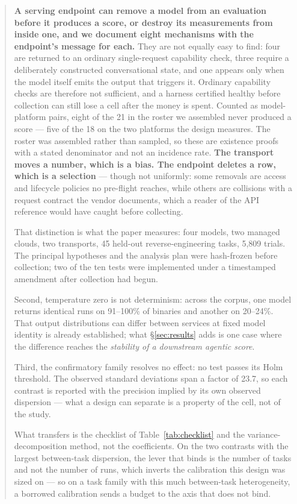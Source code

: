 \begin{abstract}
\textbf{A serving endpoint can remove a model from an evaluation before it produces a score, or destroy
its measurements from inside one, and we document eight mechanisms with the endpoint's message for each.}
They are not equally easy to find: four are returned to an ordinary single-request capability check, three
require a deliberately constructed conversational state, and one appears only when the model itself emits
the output that triggers it. Ordinary capability checks are therefore not sufficient, and a harness
certified healthy before collection can still lose a cell after the money is spent. Counted as
model-platform pairs, eight of the 21 in the roster we assembled never produced a score --- five of the 18
on the two platforms the design measures. The roster was assembled rather than sampled, so these are
existence proofs with a stated denominator and not an incidence rate. \textbf{The transport moves a number,
which is a bias. The endpoint deletes a row, which is a selection} --- though not uniformly: some removals
are access and lifecycle policies no pre-flight reaches, while others are collisions with a request
contract the vendor documents, which a reader of the API reference would have caught before collecting.

That distinction is what the paper measures: four models, two managed clouds, two transports, 45 held-out
reverse-engineering tasks, 5{,}809 trials. The principal hypotheses and the analysis plan were hash-frozen
before collection; two of the ten tests were implemented under a timestamped amendment after collection had
begun.

Second, temperature zero is not determinism: across the corpus, one model returns identical runs on
91--100\% of binaries and another on 20--24\%. That output distributions can differ between services at
fixed model identity is already established; what \S\ref{sec:results} adds is one case where the
difference reaches the \emph{stability of a downstream agentic score}.

Third, the confirmatory family resolves no effect: no test passes its Holm threshold. The observed standard
deviations span a factor of 23.7, so each contrast is reported with the precision implied by its own
observed dispersion --- what a design can separate is a property of the cell, not of the study.

What transfers is the checklist of Table~\ref{tab:checklist} and the variance-decomposition method, not
the coefficients. On the two contrasts with the largest between-task dispersion, the lever that binds is the number of
tasks and not the number of runs, which inverts the calibration this design was sized on --- so on a task family with
this much between-task heterogeneity, a borrowed calibration sends a budget to the axis that does not
bind.
\end{abstract}

